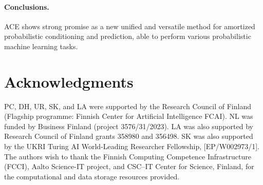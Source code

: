\documentclass[twoside]{article}
\begin{document}
\vspace{-0.25em}
\paragraph{Conclusions.} ACE shows strong promise as a new unified and versatile method for amortized probabilistic conditioning and prediction, able to perform various probabilistic machine learning tasks.


\section*{Acknowledgments}

PC, DH, UR, SK, and LA were supported by the Research Council of Finland (Flagship programme: Finnish Center for Artificial Intelligence FCAI). NL was funded by Business Finland (project 3576/31/2023). LA was also supported by Research Council of Finland grants 358980 and 356498. SK was also supported by the UKRI Turing AI World-Leading Researcher Fellowship, [EP/W002973/1].
The authors wish to thank the Finnish Computing Competence Infrastructure (FCCI), Aalto Science-IT project, and CSC–IT Center for Science, Finland, for
the computational and data storage resources provided.


\end{document}
